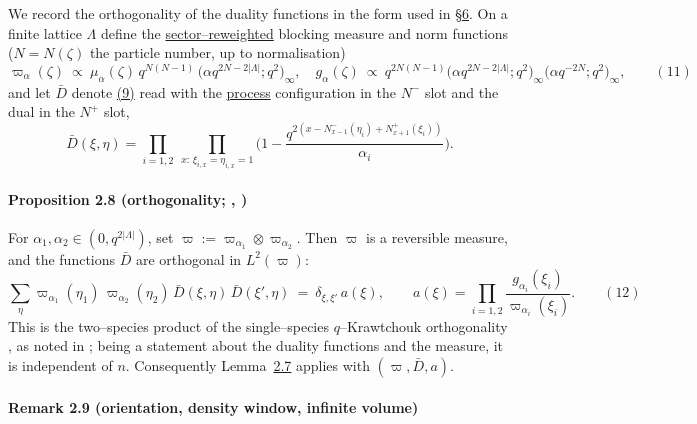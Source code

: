 \documentclass[11pt]{article}
\theoremstyle{plain}
\theoremstyle{definition}
\theoremstyle{remark}
\begin{document}
We record the orthogonality of the duality functions in the form used in
\S\hyperref[sec_ew]{6}. On a finite lattice $\Lambda$ define the \underline{sector--reweighted}
blocking measure and norm functions ($N=N(\zeta)$ the particle number, up to
normalisation)
\label{eq_omegadef}
\begin{equation}
  \varpi_\alpha(\zeta)\ \propto\ \mu_\alpha(\zeta)\,q^{N(N-1)}\,
  \big(\alpha q^{2N-2|\Lambda|};q^2\big)_\infty,\quad
  g_\alpha(\zeta)\ \propto\ q^{2N(N-1)}
  \big(\alpha q^{2N-2|\Lambda|};q^2\big)_\infty\big(\alpha q^{-2N};q^2\big)_\infty,\qquad(11)
\end{equation}
and let $\bar D$ denote \hyperref[eq_Dreu]{(9)} read with the \underline{process} configuration in
the $N^-$ slot and the dual in the $N^+$ slot,
\[
  \bar D(\xi,\eta)=\prod_{i=1,2}\ \prod_{x:\,\xi_{i,x}=\eta_{i,x}=1}
  \Big(1-\frac{q^{2\left(x-N^-_{x-1}(\eta_i)+N^+_{x+1}(\xi_i)\right)}}{\alpha_i}\Big).
\]

\paragraph{Proposition 2.8 (orthogonality; {\cite[Thm.~3.2]{CFG20}}, {\cite[\S3.1]{REU}})}\label{prop_orth}

For $\alpha_1,\alpha_2\in(0,q^{2|\Lambda|})$, set
$\varpi:=\varpi_{\alpha_1}\otimes\varpi_{\alpha_2}$. Then $\varpi$ is a reversible
measure, and the functions $\bar D$ are orthogonal in $L^2(\varpi)$:
\label{eq_orthexact}
\begin{equation}
  \sum_\eta \varpi_{\alpha_1}(\eta_1)\,\varpi_{\alpha_2}(\eta_2)\,
  \bar D(\xi,\eta)\,\bar D(\xi',\eta)\ =\ \delta_{\xi,\xi'}\,a(\xi),\qquad
  a(\xi)=\prod_{i=1,2}\frac{g_{\alpha_i}(\xi_i)}{\varpi_{\alpha_i}(\xi_i)}.\qquad(12)
\end{equation}
This is the two--species product of the single--species $q$--Krawtchouk orthogonality
\cite[Thm.~3.2]{CFG20}, as noted in \cite[\S3.1]{REU}; being a statement about the
duality functions and the measure, it is independent of $n$. Consequently
Lemma~\hyperref[lem_acr]{2.7} applies with $(\varpi,\bar D,a)$.
\par

\paragraph{Remark 2.9 (orientation, density window, infinite volume)}\label{rem_orthstatus}
\end{document}
